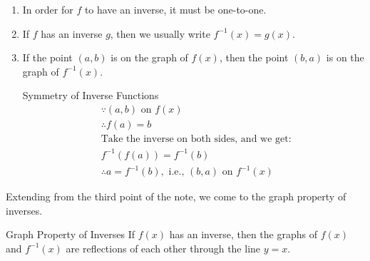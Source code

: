 \documentclass[12pt,a4paper]{article}
\def\qed{\rightline{$\blacksquare$}}
\begin{document}
\begin{enumerate}
	\item In order for $f$ to have an inverse, it must be one-to-one.
	\item If $f$ has an inverse $g$, then we usually write $f^{-1}(x)=g(x)$.
	\item If the point $(a,b)$ is on the graph of $f(x)$, then the point $(b,a)$ is on the graph of $f^{-1}(x)$.
	\begin{prf}{Symmetry of Inverse Functions}
		$$\begin{aligned}
			&\because (a, b)\text{ on }f(x)\\
			&\therefore f(a)=b\\
			&\text{Take the inverse on both sides, and we get: }\\
			&f^{-1}(f(a))=f^{-1}(b)\\
			&\therefore a=f^{-1}(b), \text{ i.e., }(b,a)\text{ on }f^{-1}(x)
		\end{aligned}$$ \qed
	\end{prf}
\end{enumerate}
Extending from the third point of the note, we come to the graph property of inverses. 
\begin{thm}{Graph Property of Inverses}
	If $f(x)$ has an inverse, then the graphs of $f(x)$ and $f^{-1}(x)$ are reflections of each other through the line $y=x$.
\end{thm}
\end{document}
